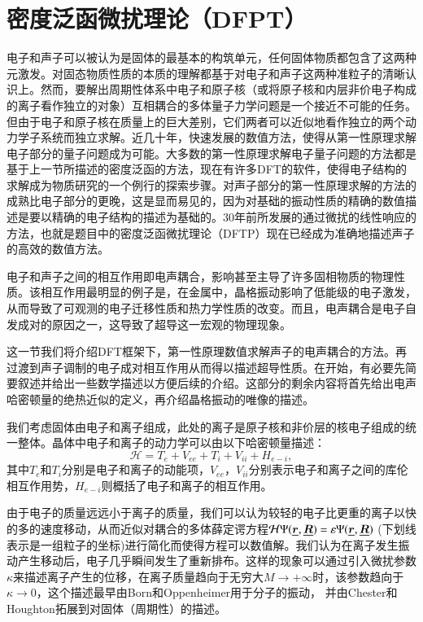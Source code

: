 \section{密度泛函微扰理论（DFPT）}

电子和声子可以被认为是固体的最基本的构筑单元，任何固体物质都包含了这两种元激发。对固态物质性质的本质的理解都基于对电子和声子这两种准粒子的清晰认识上。然而，要解出周期性体系中电子和原子核（或将原子核和内层非价电子构成的离子看作独立的对象）互相耦合的多体量子力学问题是一个接近不可能的任务。但由于电子和原子核在质量上的巨大差别，它们两者可以近似地看作独立的两个动力学子系统而独立求解。近几十年，快速发展的数值方法，使得从第一性原理求解电子部分的量子问题成为可能。大多数的第一性原理求解电子量子问题的方法都是基于上一节所描述的密度泛函的方法，现在有许多DFT的软件，使得电子结构的求解成为物质研究的一个例行的探索步骤。对声子部分的第一性原理求解的方法的成熟比电子部分的更晚，这是显而易见的，因为对基础的振动性质的精确的数值描述是要以精确的电子结构的描述为基础的。30年前所发展的通过微扰的线性响应的方法，也就是题目中的密度泛函微扰理论（DFTP）现在已经成为准确地描述声子的高效的数值方法。

电子和声子之间的相互作用即电声耦合，影响甚至主导了许多固相物质的物理性质。该相互作用最明显的例子是，在金属中，晶格振动影响了低能级的电子激发，从而导致了可观测的电子迁移性质和热力学性质的改变。而且，电声耦合是电子自发成对的原因之一，这导致了超导这一宏观的物理现象。

这一节我们将介绍DFT框架下，第一性原理数值求解声子的电声耦合的方法。再过渡到声子调制的电子成对相互作用从而得以描述超导性质。在开始，有必要先简要叙述并给出一些数学描述以方便后续的介绍。这部分的剩余内容将首先给出电声哈密顿量的绝热近似的定义，再介绍晶格振动的唯像的描述。

我们考虑固体由电子和离子组成，此处的离子是原子核和非价层的核电子组成的统一整体。晶体中电子和离子的动力学可以由以下哈密顿量描述：
\begin{equation}
  \mathcal{H} = T_e + V_{ee} + T_i + V_{ii} + H_{e-i},
\end{equation}
其中$T_e$和$T_i$分别是电子和离子的动能项，$ V_{ee}$，$V_{ii}$分别表示电子和离子之间的库伦相互作用势，$H_{e-i}$则概括了电子和离子的相互作用。

由于电子的质量远远小于离子的质量，我们可以认为较轻的电子比更重的离子以快的多的速度移动，从而近似对耦合的多体薛定谔方程$\mathcal{H} \Psi(\underline{\bm{r}},\underline{\bm{R}})=\mathcal{\varepsilon} \Psi(\underline{\bm{r}},\underline{\bm{R}})$ (下划线表示是一组粒子的坐标)进行简化而使得方程可以数值解。我们认为在离子发生振动产生移动后，电子几乎瞬间发生了重新排布。这样的现象可以通过引入微扰参数$\kappa$来描述离子产生的位移，在离子质量趋向于无穷大$M\rightarrow+\infty$时，该参数趋向于$\kappa\rightarrow 0$，这个描述最早由Born和Oppenheimer\cite{oppenheimer1927quantum}用于分子的振动，
并由Chester和Houghton\cite{chester1959electron}拓展到对固体（周期性）的描述。

